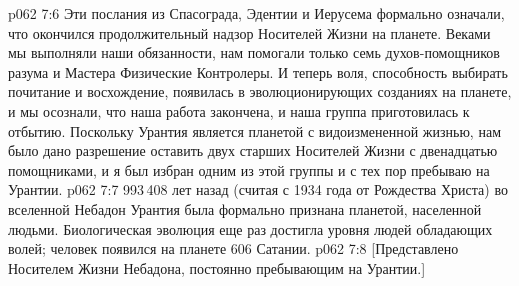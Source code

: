 \vs p062 7:6 Эти послания из Спасограда, Эдентии и Иерусема формально означали, что окончился продолжительный надзор Носителей Жизни на планете. Веками мы выполняли наши обязанности, нам помогали только семь духов\hyp{}помощников разума и Мастера Физические Контролеры. И теперь воля, способность выбирать почитание и восхождение, появилась в эволюционирующих созданиях на планете, и мы осознали, что наша работа закончена, и наша группа приготовилась к отбытию. Поскольку Урантия является планетой с видоизмененной жизнью, нам было дано разрешение оставить двух старших Носителей Жизни с двенадцатью помощниками, и я был избран одним из этой группы и с тех пор пребываю на Урантии.
\vs p062 7:7 993\,408 лет назад (считая с 1934 года от Рождества Христа) во вселенной Небадон Урантия была формально признана планетой, населенной людьми. Биологическая эволюция еще раз достигла уровня людей обладающих волей; человек появился на планете 606 Сатании.
\vs p062 7:8 [Представлено Носителем Жизни Небадона, постоянно пребывающим на Урантии.]
